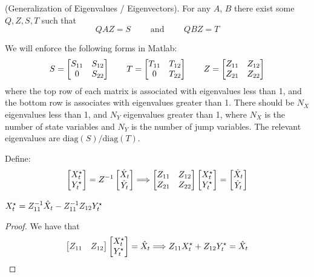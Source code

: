 \documentclass[10pt]{article}
\begin{document}
\begin{proposition}
	 (Generalization of Eigenvalues / Eigenvectors). For any $A$, $B$ there exist some $Q, Z, S, T$ such that
	\[
	QAZ = S \qquad \text{ and } \qquad QBZ = T
	\]
\end{proposition}
We will enforce the following forms in Matlab:
\[
S = \begin{bmatrix}S_{11} & S_{12} \\ 0 & S_{22}\end{bmatrix} \qquad T = \begin{bmatrix}T_{11} & T_{12} \\ 0 & T_{22}\end{bmatrix} \qquad Z = \begin{bmatrix}Z_{11} & Z_{12} \\ Z_{21} & Z_{22}\end{bmatrix}
\]
where the top row of each matrix is associated with eigenvalues less than 1, and the bottom row is associates with eigenvalues greater than 1. There should be $N_X$ eigenvalues less than 1, and $N_Y$ eigenvalues greater than 1, where $N_X$ is the number of state variables and $N_Y$ is the number of jump variables. The relevant eigenvalues are $\text{diag}(S) / \text{diag}(T)$.

Define: 
\[
\begin{bmatrix}X^\star_t \\ Y^\star_t\end{bmatrix} = Z^{-1} \begin{bmatrix}\hat{X}_t \\ \hat{Y}_t\end{bmatrix} \Longrightarrow \begin{bmatrix}Z_{11} & Z_{12} \\ Z_{21} & Z_{22}\end{bmatrix} \begin{bmatrix}X^\star_t \\ Y^\star_t\end{bmatrix} = \begin{bmatrix}\hat{X}_t \\ \hat{Y}_t\end{bmatrix} 
\]

\begin{proposition}
	$X^\star_t  =Z_{11}^{-1} \hat{X}_t - Z_{11}^{-1}Z_{12}Y_t^\star$	
\end{proposition}
\begin{proof}
	We have that
	\[
	\begin{bmatrix}Z_{11} & Z_{12}\end{bmatrix} \begin{bmatrix}X^\star_t \\ Y^\star_t\end{bmatrix} = \hat{X}_t \Longrightarrow Z_{11} X^\star_t + Z_{12}Y^\star_t = \hat{X}_t
	\]
\end{proof}
\end{document}

